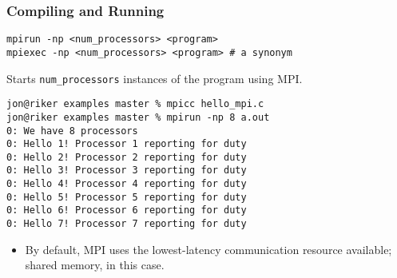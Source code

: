 \documentclass[aspectratio=43]{beamer}
\newenvironment{changemargin}[1]{%
  \begin{list}{}{%
    \setlength{\topsep}{0pt}%
    \setlength{\leftmargin}{#1}%
    \setlength{\rightmargin}{1em}
    \setlength{\listparindent}{\parindent}%
    \setlength{\itemindent}{\parindent}%
    \setlength{\parsep}{\parskip}%
  }%
  \item[]}{\end{list}}
\begin{document}
\begin{frame}[fragile]
  \frametitle{Compiling and Running}

  \begin{changemargin}{1.5cm}

  \begin{lstlisting}
mpirun -np <num_processors> <program>
mpiexec -np <num_processors> <program> # a synonym
  \end{lstlisting}

  
   Starts {\tt num\_processors} instances of the program using MPI.

  \begin{lstlisting}
jon@riker examples master % mpicc hello_mpi.c 
jon@riker examples master % mpirun -np 8 a.out
0: We have 8 processors
0: Hello 1! Processor 1 reporting for duty
0: Hello 2! Processor 2 reporting for duty
0: Hello 3! Processor 3 reporting for duty
0: Hello 4! Processor 4 reporting for duty
0: Hello 5! Processor 5 reporting for duty
0: Hello 6! Processor 6 reporting for duty
0: Hello 7! Processor 7 reporting for duty
  \end{lstlisting}

  \begin{itemize}
    \item By default, MPI uses the lowest-latency communication resource available; shared 
      memory, in this case.
  \end{itemize}
  \end{changemargin}
\end{frame}
\end{document}

